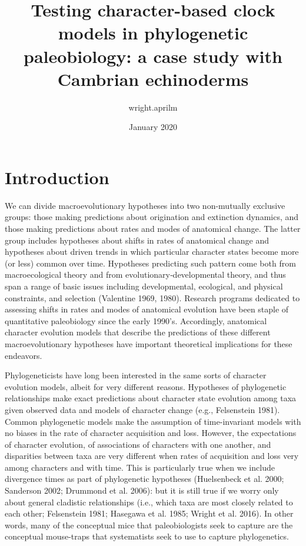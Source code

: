 \documentclass{article}
\title{Testing character-based clock models in phylogenetic paleobiology: a case study with Cambrian echinoderms}
\author{wright.aprilm }
\date{January 2020}
\newcommand{\amw}[1]{{\textcolor{ForestGreen}{AW: #1}}} %
\begin{document}
\maketitle


\section{Introduction}

We can divide macroevolutionary hypotheses into two non-mutually exclusive groups: those making predictions about origination and extinction dynamics, and those making predictions about rates and modes of anatomical change. 
The latter group includes hypotheses about shifts in rates of anatomical change and hypotheses about driven trends in which particular character states become more (or less) common over time.  
Hypotheses predicting such pattern come both from macroecological theory and from evolutionary‑developmental theory, and thus span a range of basic issues including developmental, ecological, and physical constraints, and selection (Valentine 1969, 1980). 
Research programs dedicated to assessing shifts in rates and modes of anatomical evolution have been staple of quantitative paleobiology since the early 1990’s. 
Accordingly, anatomical character evolution models that describe the predictions of these different macroevolutionary hypotheses have important theoretical implications for these endeavors. %

Phylogeneticists have long been interested in the same sorts of character evolution models, albeit for very different reasons.  
Hypotheses of phylogenetic relationships make exact predictions about character state evolution among taxa given observed data and models of character change (e.g., Felsenstein 1981).  
Common phylogenetic models make the assumption of time-invariant models with no biases in the rate of character acquisition and loss.
However, the expectations of character evolution, of associations of characters with one another, and disparities between taxa are very different when rates of acquisition and loss very among characters and with time.
This is particularly true when we include divergence times as part of phylogenetic hypotheses (Huelsenbeck et al. 2000; Sanderson 2002; Drummond et al. 2006): but it is still true if we worry only about general cladistic relationships (i.e., which taxa are most closely related to each other; Felsenstein 1981; Hasegawa et al. 1985; Wright et al. 2016).  
In other words, many of the conceptual mice that paleobiologists seek to capture are the conceptual mouse-traps that systematists seek to use to capture phylogenetics.  
\end{document}
